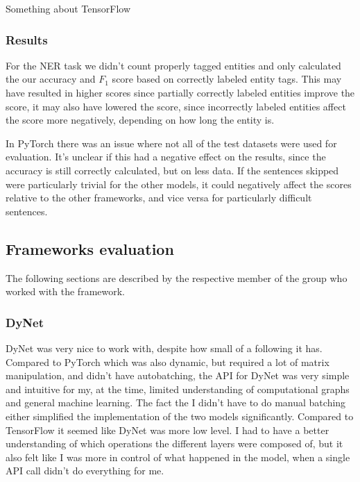 Something about TensorFlow %

\subsubsection{Results}

For the NER task we didn't count properly tagged entities and only calculated
the our accuracy and $F_1$ score based on correctly labeled entity tags. This
may have resulted in higher scores since partially correctly labeled entities
improve the score, it may also have lowered the score, since incorrectly labeled
entities affect the score more negatively, depending on how long the entity is. 

In PyTorch there was an issue where not all of the test datasets were used for
evaluation. It's unclear if this had a negative effect on the results, since the
accuracy is still correctly calculated, but on less data. If the sentences
skipped were particularly trivial for the other models, it could negatively
affect the scores relative to the other frameworks, and vice versa for
particularly difficult sentences.



\subsection{Frameworks evaluation}\label{subsec:frameworks}

The following sections are described by the respective member of the group who
worked with the framework. 

\subsubsection{DyNet}

DyNet was very nice to work with, despite how small of a following it has.
Compared to PyTorch which was also dynamic, but required a lot of matrix
manipulation, and didn't have autobatching, the API for DyNet was very simple
and intuitive for my, at the time, limited understanding of computational graphs
and general machine learning. The fact the I didn't have to do manual batching
either simplified the implementation of the two models significantly. Compared
to TensorFlow it seemed like DyNet was more low level. I had to have a better
understanding of which operations the different layers were composed of, but it
also felt like I was more in control of what happened in the model, when a
single API call didn't do everything for me.

